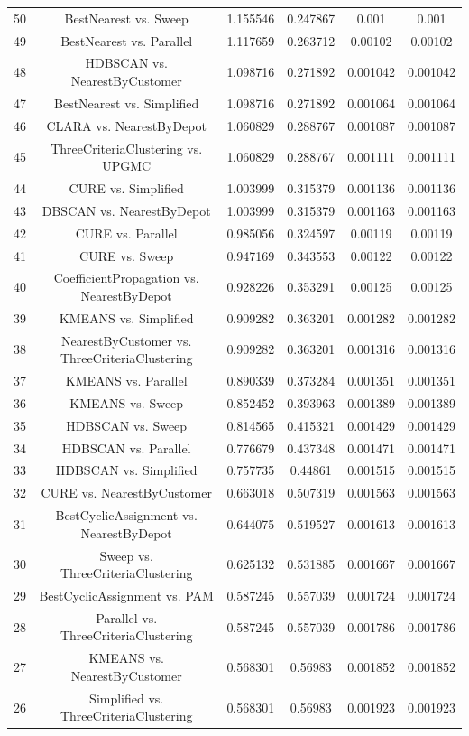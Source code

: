 \documentclass[a4paper,10pt]{article}
\begin{document}
\begin{landscape}
\begin{table}[!htp]
\begin{tabular}{cccccc}
50&BestNearest vs. Sweep&1.155546&0.247867&0.001&0.001\\
49&BestNearest vs. Parallel&1.117659&0.263712&0.00102&0.00102\\
48&HDBSCAN vs. NearestByCustomer&1.098716&0.271892&0.001042&0.001042\\
47&BestNearest vs. Simplified&1.098716&0.271892&0.001064&0.001064\\
46&CLARA vs. NearestByDepot&1.060829&0.288767&0.001087&0.001087\\
45&ThreeCriteriaClustering vs. UPGMC&1.060829&0.288767&0.001111&0.001111\\
44&CURE vs. Simplified&1.003999&0.315379&0.001136&0.001136\\
43&DBSCAN vs. NearestByDepot&1.003999&0.315379&0.001163&0.001163\\
42&CURE vs. Parallel&0.985056&0.324597&0.00119&0.00119\\
41&CURE vs. Sweep&0.947169&0.343553&0.00122&0.00122\\
40&CoefficientPropagation vs. NearestByDepot&0.928226&0.353291&0.00125&0.00125\\
39&KMEANS vs. Simplified&0.909282&0.363201&0.001282&0.001282\\
38&NearestByCustomer vs. ThreeCriteriaClustering&0.909282&0.363201&0.001316&0.001316\\
37&KMEANS vs. Parallel&0.890339&0.373284&0.001351&0.001351\\
36&KMEANS vs. Sweep&0.852452&0.393963&0.001389&0.001389\\
35&HDBSCAN vs. Sweep&0.814565&0.415321&0.001429&0.001429\\
34&HDBSCAN vs. Parallel&0.776679&0.437348&0.001471&0.001471\\
33&HDBSCAN vs. Simplified&0.757735&0.44861&0.001515&0.001515\\
32&CURE vs. NearestByCustomer&0.663018&0.507319&0.001563&0.001563\\
31&BestCyclicAssignment vs. NearestByDepot&0.644075&0.519527&0.001613&0.001613\\
30&Sweep vs. ThreeCriteriaClustering&0.625132&0.531885&0.001667&0.001667\\
29&BestCyclicAssignment vs. PAM&0.587245&0.557039&0.001724&0.001724\\
28&Parallel vs. ThreeCriteriaClustering&0.587245&0.557039&0.001786&0.001786\\
27&KMEANS vs. NearestByCustomer&0.568301&0.56983&0.001852&0.001852\\
26&Simplified vs. ThreeCriteriaClustering&0.568301&0.56983&0.001923&0.001923\\

\end{tabular}
\end{table}
\end{landscape}
\end{document}
